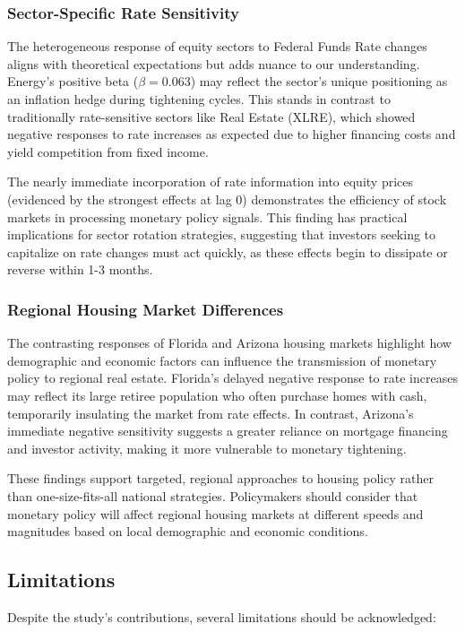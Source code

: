 \documentclass[12pt, stu, abstract]{apa7}
\begin{document}
\subsubsection{Sector-Specific Rate Sensitivity}
The heterogeneous response of equity sectors to Federal Funds Rate changes aligns with theoretical expectations but adds nuance to our understanding. Energy's positive beta ($\beta = 0.063$) may reflect the sector's unique positioning as an inflation hedge during tightening cycles. This stands in contrast to traditionally rate-sensitive sectors like Real Estate (XLRE), which showed negative responses to rate increases as expected due to higher financing costs and yield competition from fixed income.

The nearly immediate incorporation of rate information into equity prices (evidenced by the strongest effects at lag 0) demonstrates the efficiency of stock markets in processing monetary policy signals. This finding has practical implications for sector rotation strategies, suggesting that investors seeking to capitalize on rate changes must act quickly, as these effects begin to dissipate or reverse within 1-3 months.

\subsubsection{Regional Housing Market Differences}
The contrasting responses of Florida and Arizona housing markets highlight how demographic and economic factors can influence the transmission of monetary policy to regional real estate. Florida's delayed negative response to rate increases may reflect its large retiree population who often purchase homes with cash, temporarily insulating the market from rate effects. In contrast, Arizona's immediate negative sensitivity suggests a greater reliance on mortgage financing and investor activity, making it more vulnerable to monetary tightening.

These findings support targeted, regional approaches to housing policy rather than one-size-fits-all national strategies. Policymakers should consider that monetary policy will affect regional housing markets at different speeds and magnitudes based on local demographic and economic conditions.

\subsection{Limitations}
Despite the study's contributions, several limitations should be acknowledged:
\end{document}
